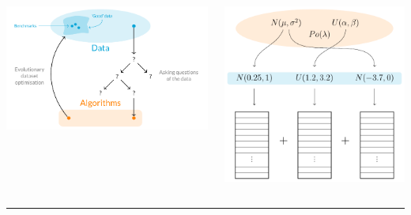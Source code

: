 \documentclass{beamer}
\begin{document}
\begin{columns}
    \begin{column}{0.4\textwidth}
        \begin{center}
            \includegraphics[width=\linewidth]{tex/paradigm.pdf}
        \end{center}
    \end{column}
    \begin{column}{0.4\textwidth}
        \centering%
        \includegraphics[width=.7\linewidth]{tex/individual.pdf}

    \end{column}
\end{columns}

\vspace{2em}
\hrule height 3pt
\vspace{2em}
\end{document}
